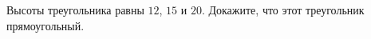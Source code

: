 \begin{ex}
	\begin{condition}
		Высоты треугольника равны \( 12 \), \( 15  \) и \( 20 \). Докажите,	что этот треугольник прямоугольный.
	\end{condition}
\end{ex}